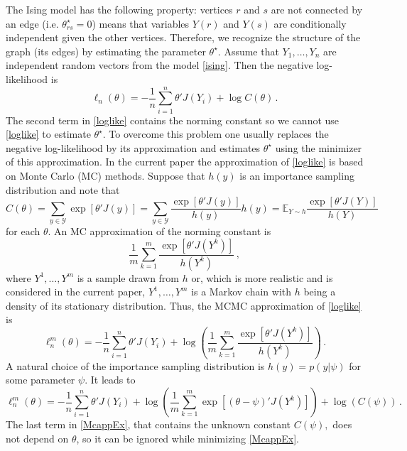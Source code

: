 \documentclass[twoside,11pt]{article}
\def\lln{\ell_n}
\def\llnm{\ell_n^m}
\def\th{\theta}
\def\Ex{\mathbb{E}}
\def\ths{\th^\star}
\def\Y{\mathcal{Y}}
\begin{document}
The Ising model has the following property: vertices $r$ and $s$ are not connected by an edge (i.e. $\ths _{rs} = 0$) means that variables $Y(r)$ and $Y(s)$
are conditionally independent given the other vertices. Therefore, we recognize the structure of the graph (its edges) by estimating the parameter $\ths.$
Assume that $Y_1, \ldots, Y_n$ are independent random vectors from the model \eqref{ising}. Then the negative log-likelihood is 
\begin{equation}
\label{loglike}
\lln(\theta)=  - \frac{1}{n} \sum_{i=1}^{n}   \th ' J(Y_i) + \log {C(\th)}\,.
\end{equation}
The second term in \eqref{loglike} contains the norming constant so we cannot use \eqref{loglike} to estimate $\ths.$ To overcome this problem one usually replaces the negative log-likelihood by its approximation and estimates $\ths$ using the minimizer of this approximation. In the current 
paper the approximation of \eqref{loglike} is based on Monte Carlo (MC) methods. Suppose that  $h(y)$ is an importance sampling distribution and note that
\begin{equation}
\label{constant}
{C(\th)}=\sum_{y \in \Y} \exp \left[\th ' J(y)\right] =\sum_{y \in \Y} \frac{\exp \left[\th ' J(y)\right]}{h(y)}h(y) =\Ex_{Y\sim h}\frac{\exp \left[\th ' J(Y)\right]}{h(Y)}
\end{equation}
for each $\th .$
An MC approximation of the norming constant is
\begin{equation}
\label{approxim}
\frac{1}{m}\sum_{k=1}^{m}\frac{\exp \left[\th ' J(Y^k)\right]}{h(Y^k)} \,,
\end{equation}
where $Y^1,\ldots, Y^m$ is a  sample drawn from $h$ or, which is more realistic and is considered in the current paper,
$Y^1,\ldots, Y^m$ is a Markov chain with $h$ being a density of its stationary distribution. 
 Thus, the MCMC approximation of \eqref{loglike} is 
\begin{equation}
\label{MCapprox}
\llnm (\th) = - \frac{1}{n} \sum_{i=1}^{n}   \th ' J(Y_i) 
+ \log
\left( \frac{1}{m}\sum_{k=1}^{m}\frac{\exp \left[ \th ' J(Y^k)\right]}{h(Y^k)} \right)\,.
\end{equation}
A natural choice of the importance sampling distribution is $h(y) =p(y|\psi)$ for some parameter $\psi.$ It leads to  
\begin{equation} 
\label{McappEx}
\llnm (\th) =  - \frac{1}{n} \sum_{i=1}^{n}   \th ' J(Y_i) 
+ \log
\left( \frac{1}{m}\sum_{k=1}^{m} \exp \left[ (\th- \psi) ' J(Y^k)\right] \right)
+ \log (C(\psi))\,.
\end{equation}
The last term in \eqref{McappEx}, that contains the unknown constant  $C(\psi),$ does not depend on $\th$, so it can be ignored while minimizing \eqref{McappEx}. 
\end{document}
